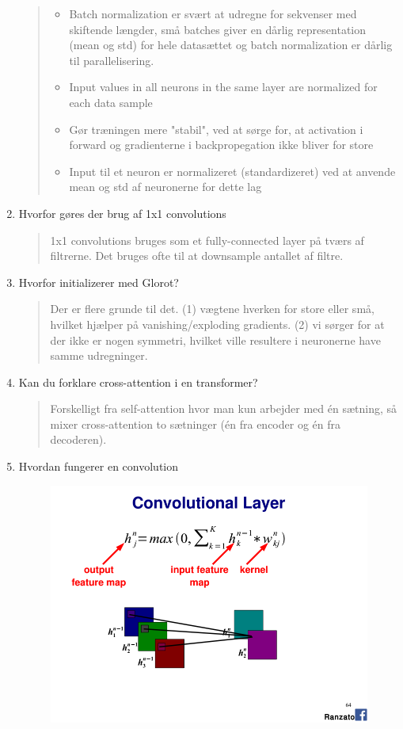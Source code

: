 \documentclass[a4paper]{report}
\begin{document}
\begin{enumerate}
\begin{quote}
        \begin{itemize}
            \item Batch normalization er svært at udregne for sekvenser med skiftende længder, små batches giver en dårlig representation (mean og std) for hele datasættet og batch normalization er dårlig til parallelisering.
            \item Input values in all neurons in the same layer are normalized for each data sample
            \item Gør træningen mere "stabil", ved at sørge for, at activation i forward og gradienterne i backpropegation ikke bliver for store 
            \item Input til et neuron er normalizeret (standardizeret) ved at anvende mean og std af neuronerne for dette lag 
        \end{itemize}
    \end{quote}
    \item Hvorfor gøres der brug af 1x1 convolutions
    \begin{quote}
        1x1 convolutions bruges som et fully-connected layer på tværs af filtrerne. Det bruges ofte til at downsample antallet af filtre.
    \end{quote}
    \item Hvorfor initializerer med Glorot?
    \begin{quote}
        Der er flere grunde til det. (1) vægtene hverken for store eller små, hvilket hjælper på vanishing/exploding gradients. (2) vi sørger for at der ikke er nogen symmetri, hvilket ville resultere i neuronerne have samme udregninger. 
    \end{quote}
    \item Kan du forklare cross-attention i en transformer?
    \begin{quote}
        Forskelligt fra self-attention hvor man kun arbejder med én sætning, så mixer cross-attention to sætninger (én fra encoder og én fra decoderen).
    \end{quote}
    \item Hvordan fungerer en convolution
    \begin{figure}[htbp]
        \centering
        \includegraphics[width = 0.6 \textwidth]{./entities/convolutions_explained.png}

\end{figure}
\end{enumerate}
\end{document}
